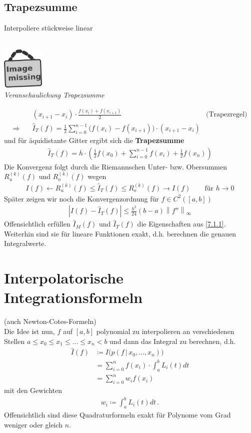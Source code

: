 \documentclass[ngerman,fontsize=11pt, paper=a4, parskip=half, titlepage=true, toc=bib]{scrbook}
\theoremstyle{definition}
\theoremstyle{plain}
\newcommand{\nn}[1]{\left\| #1 \right\|}	%
\newcommand{\sectione}[1]{ \setcounter{equation}{0}\section{#1}}
\newcommand{\subsectione}[1]{\addtocounter{Def}{1}\subsection{#1}}
\newcommand{\imagemissing}[1]{
  \begin{center}~\\
    \centering 
    \includegraphics[width=2cm]{images/image_missing.jpg}\\
    \textit{#1} \\
  \end{center}
}
\begin{document}
\subsectione{Trapezsumme}
Interpoliere stückweise linear
\imagemissing{Veranschaulichung Trapezsumme}\label{im7.1.3}
\begin{align}\nonumber
  &(x_{i+1}-x_i)\cdot \frac{f(x_i)+f(x_{i+1})}{2} 
  &\text{(Trapezregel)}\\
  \Rightarrow\quad
  & \hat{I}_T(f) = \frac{1}{2}\sum_{i=0}^{n-1}
    \big(
    f(x_i)-f(x_{i+1})
    \big)
    \cdot (x_{i+1}-x_i)
    \label{VII.1.6}
\end{align}
und für äquidistante Gitter ergibt sich die \textbf{Trapezsumme}
\begin{gather}
  \hat{I}_T(f) = h\cdot\left( \frac{1}{2}f(x_0)
    +\sum_{i=0}^{n-1}f(x_i)
    +\frac{1}{2} f(x_n)
  \right)
  \label{VII.1.7}
\end{gather}
Die Konvergenz folgt durch die Riemannschen Unter- bzw. Obersummen
$R_u^{(k)}(f)$ und $R_o^{(k)}(f)$ wegen
\begin{gather*}
  I(f)\longleftarrow R_u^{(k)}(f)
  \leq \hat{I}_T(f)
  \leq R_o^{(k)}(f)\longrightarrow I(f)
  \qquad \text{für } h\longrightarrow 0
\end{gather*}
Später zeigen wir noch die Konvergenzordnung für $f\in C^2([a,b])$
\begin{gather}
  \left| I(f)-\hat{I}_T(f)\right| \leq \frac{h^2}{24}(b-a)\nn{f''}_\infty
  \label{VII.1.8}
\end{gather}
Offensichtlich erfüllen $\hat{I}_M(f)$ und $\hat{I}_T(f)$
die Eigenschaften aus \ref{7.1.1}.
Weiterhin sind sie für lineare Funktionen exakt,
d.h. berechnen die genauen Integralwerte.


\sectione{Interpolatorische Integrationsformeln}
(auch Newton-Cotes-Formeln)\\
Die Idee ist nun, $f$ auf $[a,b]$ polynomial zu interpolieren
an verschiedenen Stellen $a\leq x_0\leq x_1\leq \dots\leq x_n<b$
und dann das Integral zu berechnen, d.h.
\begin{align}\nonumber
  \hat{I}(f) &\coloneqq I\big( p(f\,|\,x_0,\dots, x_n)\big)\\\nonumber
             &=\sum_{i=0}^{n}f(x_i)
               \cdot \int_a^bL_i(t)dt\\
             &=\sum_{i=0}^{n} w_if(x_i)
               \label{VII.2.1}
\end{align}
mit den Gewichten 
\begin{gather}
  w_i\coloneqq \int_a^bL_i(t)dt\, .
  \label{VII.2.2}
\end{gather}
Offensichtlich sind diese Quadraturformeln exakt
für Polynome vom Grad weniger oder gleich $n$.
\end{document}
